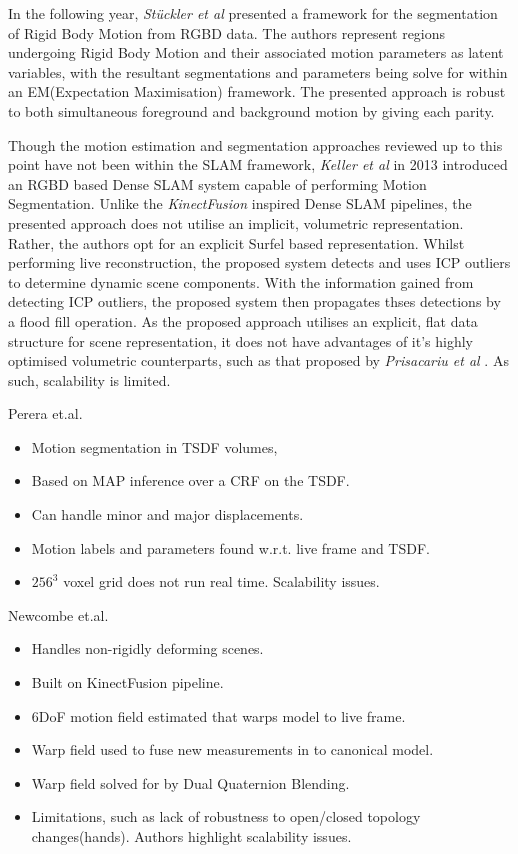 In the following year, \textit{St{\"u}ckler et al} \cite{Stueckler2013} presented a framework 
for the segmentation of Rigid Body Motion from RGBD data. The authors represent regions undergoing 
Rigid Body Motion and their associated motion parameters as latent variables, with the resultant 
segmentations and parameters being solve for within an EM(Expectation Maximisation) framework. 
The presented approach is robust to both simultaneous foreground and background motion by giving 
each parity.

Though the motion estimation and segmentation approaches reviewed up to this point have not 
been within the SLAM framework, \textit{Keller et al} \cite{Keller2013} in 2013 introduced an 
RGBD based Dense SLAM system capable of performing Motion Segmentation. Unlike the \textit{KinectFusion} 
\cite{Newcombe2011} inspired Dense SLAM pipelines, the presented approach does not utilise an 
implicit, volumetric representation. Rather, the authors opt for an explicit Surfel \cite{Pfister2000} 
based representation. Whilst performing live reconstruction, the proposed system detects and uses ICP 
outliers to determine dynamic scene components. With the information gained from detecting ICP outliers, 
the proposed system then propagates thses detections by a flood fill operation. As the proposed approach 
utilises an explicit, flat data structure for scene representation, it does not have advantages of 
it's highly optimised volumetric counterparts, such as that proposed by \textit{Prisacariu et al} 
\cite{Prisacariu2011}. As such, scalability is limited.

Perera et.al. \cite{Perera2015}
\begin{itemize}
	\item Motion segmentation in TSDF volumes,
	\item Based on MAP inference over a CRF on the TSDF.
	\item Can handle minor and major displacements.
	\item Motion labels and parameters found w.r.t. live frame and TSDF.
	\item $256^{3}$ voxel grid does not run real time. Scalability issues.
\end{itemize}

Newcombe et.al. \cite{Newcombe2015}
\begin{itemize}
	\item Handles non-rigidly deforming scenes.
	\item Built on KinectFusion pipeline.
	\item 6DoF motion field estimated that warps model to live frame.
	\item Warp field used to fuse new measurements in to canonical model.
	\item Warp field solved for by Dual Quaternion Blending. \cite{Kavan2006}
	\item Limitations, such as lack of robustness to open/closed topology changes(hands). Authors highlight scalability issues.
\end{itemize}

